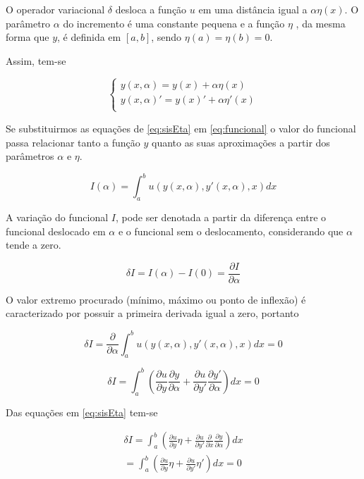 O operador variacional $ \delta $ desloca a função $ u $ em uma distância igual a $ \alpha \eta(x) $. O parâmetro $ \alpha $ do incremento é uma constante pequena e a função $ \eta $ , da mesma forma que $ y $, é definida em $[a,b]$, sendo $\eta(a) = \eta(b) = 0$.

Assim, tem-se 

\begin{equation}
	\label{eq:sisEta}
	\begin{cases}
        y(x, \alpha) = y(x) + \alpha \eta(x) \\
        y(x, \alpha)' = y(x)' + \alpha \eta'(x) \\
    \end{cases}
\end{equation}

Se substituirmos as equações de \ref{eq:sisEta} em \ref{eq:funcional} o valor do funcional passa relacionar tanto a função $ y $ quanto as suas aproximações a partir dos parâmetros $ \alpha $ e $ \eta $.

\begin{equation}
\label{eq:funcionalVar}
I(\alpha) = \int_{a}^{b} u(y(x, \alpha), y'(x, \alpha), x) dx
\end{equation}

A variação do funcional $ I $, pode ser denotada a partir da diferença entre o funcional deslocado em $ \alpha $ e o funcional sem o deslocamento, considerando que $\alpha $ tende a zero.

\begin{equation}
\delta I = I(\alpha) - I(0) = \frac{\partial I}{\partial \alpha}
\end{equation}

O valor extremo procurado (mínimo, máximo ou ponto de inflexão) é caracterizado por possuir a primeira derivada igual a zero, portanto

\begin{equation}
\delta I = \frac{\partial}{\partial \alpha} \int_{a}^{b} u(y(x, \alpha), y'(x, \alpha), x) dx = 0
\end{equation}

\begin{equation}
\delta I = \int_{a}^{b} \left(\frac{\partial u}{\partial y} \frac{\partial y}{\partial \alpha} + \frac{\partial u}{\partial y'} \frac{\partial y'}{\partial \alpha}\right) dx = 0
\end{equation}

Das equações em \ref{eq:sisEta} tem-se 

\begin{equation}
\begin{split}
\delta I = \int_{a}^{b} \left(\frac{\partial u}{\partial y} \eta + \frac{\partial u}{\partial y'} \frac{\partial }{\partial x}
\frac{\partial y}{\partial \alpha}\right) dx \\
= \int_{a}^{b} \left(\frac{\partial u}{\partial y} \eta + \frac{\partial u}{\partial y'} \eta'
\right) dx = 0
\end{split}
\end{equation}

